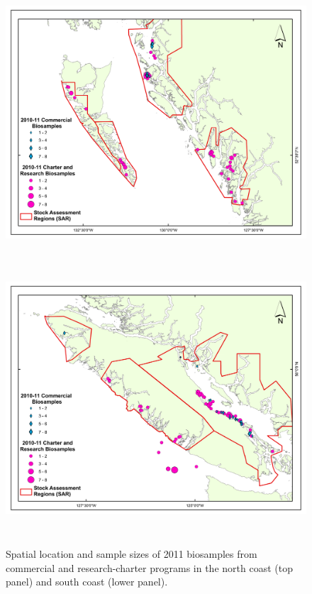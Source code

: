 	
	
	
	

\begin{figure}[htbp]
	\centering
		\includegraphics[height=4in]{../FIGS/2011_biosamples_maps/2011_biosamplesNC_SAR.pdf}
		\includegraphics[height=4in]{../FIGS/2011_biosamples_maps/2011_biosamplesSC_SAR.pdf}
		
	\caption{Spatial location and sample sizes of 2011 biosamples from commercial and research-charter programs in the north coast (top panel) and south coast (lower panel).}
	\label{fig:FIGS_2011_biosamples_maps_2011_biosamplesNC_SAR}
\end{figure}
	

